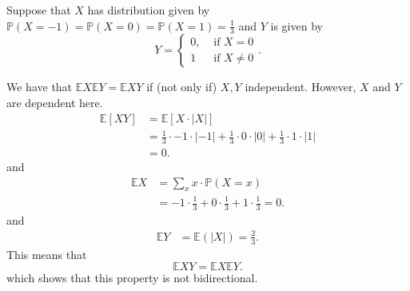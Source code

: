 \begin{eg}
	Suppose that \( X \) has distribution given by \( \mathbb{P}(X=-1) = \mathbb{P}(X=0) = \mathbb{P}(X=1) = \frac{1}{3} \) and \( Y \) is given by \[
		Y = \begin{cases}
			0, &\text{ if }X=0\\
			1 &\text{ if }X\neq 0
		\end{cases}
	.\] 
\end{eg}
\begin{explanation}
	We have that \( \mathbb{E}X \mathbb{E}Y = \mathbb{E}XY \) if (not only if) \( X,Y \) independent. However, \( X \) and \( Y \) are dependent here.
	\begin{align*}
		\mathbb{E}[XY] &= \mathbb{E}[X \cdot |X|] \\
		&=\frac{1}{3} \cdot -1\cdot |-1| + \frac{1}{3}\cdot 0\cdot |0|+\frac{1}{3} \cdot 1\cdot |1| \\
		&= 0 
	.\end{align*}
	and 
	\begin{align*}
		\mathbb{E}X &= \sum_{x}x\cdot \mathbb{P}(X=x) \\
		&= -1\cdot \frac{1}{3}+0\cdot \frac{1}{3}+1\cdot \frac{1}{3} = 0 
	.\end{align*}
	and 
	\begin{align*}
		\mathbb{E}Y &= \mathbb{E}(|X|) = \frac{2}{3} 
	.\end{align*}
	This means that \[
		\mathbb{E}XY = \mathbb{E}X\mathbb{E}Y 
	.\] which shows that this property is not bidirectional.
\end{explanation}
